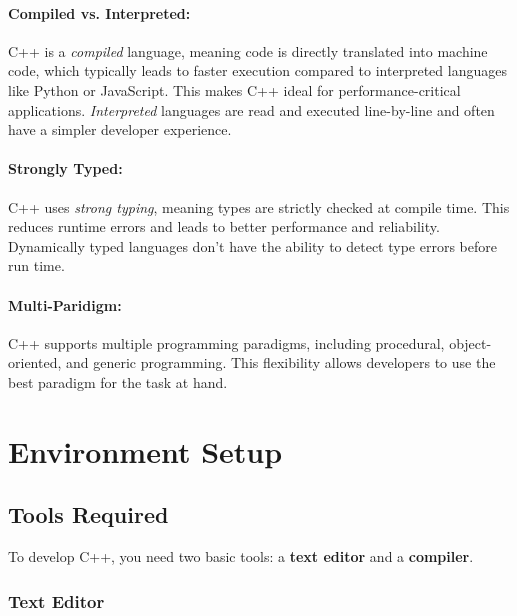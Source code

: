 \documentclass{article}
\begin{document}
\paragraph{Compiled vs. Interpreted:}
C++ is a \textit{compiled} language, meaning code is directly translated into machine code, which typically leads to faster execution compared to interpreted languages like Python or JavaScript. This makes C++ ideal for performance-critical applications. \textit{Interpreted} languages are read and executed line-by-line and often have a simpler developer experience.

\paragraph{Strongly Typed:}
C++ uses \textit{strong typing}, meaning types are strictly checked at compile time. This reduces runtime errors and leads to better performance and reliability. Dynamically typed languages don't have the ability to detect type errors before run time.

\paragraph{Multi-Paridigm:}
C++ supports multiple programming paradigms, including procedural, object-oriented, and generic programming. This flexibility allows developers to use the best paradigm for the task at hand.

\section{Environment Setup}

\subsection{Tools Required}

\noindent
To develop C++, you need two basic tools: a \textbf{text editor} and a \textbf{compiler}.

\subsubsection{Text Editor}
\end{document}
